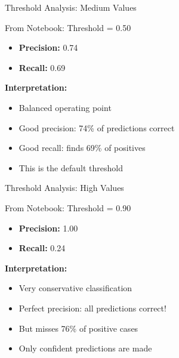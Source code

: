 \documentclass{beamer}
\begin{document}
\begin{frame}{Threshold Analysis: Medium Values}
\begin{examplebox}{From Notebook: Threshold = 0.50}
\small
\begin{itemize}
    \item \textbf{Precision:} 0.74
    \item \textbf{Recall:} 0.69
\end{itemize}

\vspace{0.2cm}

\textbf{Interpretation:}
\begin{itemize}
    \item Balanced operating point
    \item Good precision: 74\% of predictions correct
    \item Good recall: finds 69\% of positives
    \item This is the default threshold
\end{itemize}
\end{examplebox}
\end{frame}

\begin{frame}{Threshold Analysis: High Values}
\begin{examplebox}{From Notebook: Threshold = 0.90}
\small
\begin{itemize}
    \item \textbf{Precision:} 1.00
    \item \textbf{Recall:} 0.24
\end{itemize}

\vspace{0.2cm}

\textbf{Interpretation:}
\begin{itemize}
    \item Very conservative classification
    \item Perfect precision: all predictions correct!
    \item But misses 76\% of positive cases
    \item Only confident predictions are made
\end{itemize}
\end{examplebox}
\end{frame}
\end{document}
